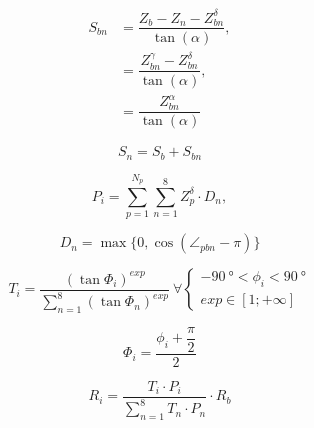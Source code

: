 \documentclass[10pt,a4paper]{article}
\begin{document}
	\begin{equation}
		\begin{split}
			S_{bn} & = \dfrac{Z_b - Z_n - Z_{bn}^{\delta}}{\tan(\alpha)}, \\
			& = \dfrac{Z_{bn}^{\gamma} - Z_{bn}^{\delta}}{\tan(\alpha)}, \\	
			& = \dfrac{Z_{bn}^{\alpha}}{\tan(\alpha)}
		\end{split}
	\end{equation}

	\begin{equation}
		S_n = S_b + S_{bn}
	\end{equation}


	\begin{equation}\label{equation:persistence}
		P_i = \sum_{p = 1}^{N_p} \sum_{n=1}^{8} Z^\delta_{p} \cdot D_{n},
	\end{equation}

	\begin{equation}\label{equation:direction}
		D_{n} = \max \{ 0,\cos{(\angle _{pbn} - \pi)} \}
	\end{equation}

	\begin{equation} \label{equation:terrain}
		T_{i} = \dfrac{\left(\tan \Phi_i \right)^{exp}}{\sum_{n=1}^{8}\left(\tan \Phi_n \right)^{exp}} \ \forall \begin{cases}
			\SI{-90}{\degree} < \phi_i < \SI{90}{\degree} \\
			exp \in \left[1; +\infty \right]
		\end{cases}
	\end{equation}

	\begin{equation}
		\Phi_i = \dfrac{\phi_i + \dfrac{\pi}{2}}{2}
	\end{equation}
	
	\begin{equation}\label{equation:routing}
		R_i = \dfrac{T_i \cdot P_i}{\sum_{n=1}^{8} T_n \cdot P_n} \cdot R_b 
	\end{equation}
	
\end{document}
